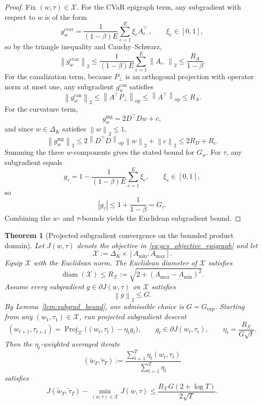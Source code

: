 \documentclass[11pt]{article}
\newcommand{\1}{\mathbf{1}}
\newcommand{\proj}{\operatorname{Proj}}
\newcommand{\norm}[1]{\left\lVert #1 \right\rVert}
\newcommand{\abs}[1]{\left\lvert #1 \right\rvert}
\newcommand{\Dset}{\Delta_K}
\newcommand{\Pperp}{P_\perp}
\theoremstyle{plain}
\newtheorem{theorem}{Theorem}[section]
\theoremstyle{definition}
\theoremstyle{remark}
\begin{document}
\begin{proof}
Fix $(w,\tau)\in\mathcal{X}$. For the CVaR epigraph term, any subgradient with respect to $w$ is of the form
\[
g^{\mathrm{cvar}}_w = \frac{1}{(1-\beta)E}\sum_{e=1}^E \xi_e A_{e\cdot}^\top,
\qquad \xi_e\in[0,1],
\]
so by the triangle inequality and Cauchy--Schwarz,
\[
\norm{g^{\mathrm{cvar}}_w}_2
\le \frac{1}{(1-\beta)E}\sum_{e=1}^E \norm{A_{e\cdot}}_2
\le \frac{R_A}{1-\beta}.
\]
For the canalization term, because $\Pperp$ is an orthogonal projection with operator norm at most one, any subgradient $g^{\mathrm{can}}_w$ satisfies
\[
\norm{g^{\mathrm{can}}_w}_2 \le \norm{A^\top\Pperp}_{\mathrm{op}} \le \norm{A^\top}_{\mathrm{op}} \le R_A.
\]
For the curvature term,
\[
g^{\mathrm{mg}}_w = 2D^\top Dw + c,
\]
and since $w\in\Dset$ satisfies $\norm{w}_2\le 1$,
\[
\norm{g^{\mathrm{mg}}_w}_2 \le 2\norm{D^\top D}_{\mathrm{op}}\norm{w}_2 + \norm{c}_2 \le 2R_D + R_c.
\]
Summing the three $w$-components gives the stated bound for $G_w$. For $\tau$, any subgradient equals
\[
g_\tau = 1 - \frac{1}{(1-\beta)E}\sum_{e=1}^E \xi_e,
\qquad \xi_e\in[0,1],
\]
so
\[
\abs{g_\tau}\le 1+\frac{1}{1-\beta}=G_\tau.
\]
Combining the $w$- and $\tau$-bounds yields the Euclidean subgradient bound.
\end{proof}

\begin{theorem}[Projected subgradient convergence on the bounded product domain]\label{thm:subgrad}
Let $J(w,\tau)$ denote the objective in \eqref{eq:gcs_objective_epigraph} and let
\[
\mathcal{X} := \Dset \times [A_{\min},A_{\max}].
\]
Equip $\mathcal{X}$ with the Euclidean norm. The Euclidean diameter of $\mathcal{X}$ satisfies
\[
\operatorname{diam}(\mathcal{X}) \le R_{\mathcal{X}} := \sqrt{2 + (A_{\max}-A_{\min})^2}.
\]
Assume every subgradient $g\in\partial J(w,\tau)$ on $\mathcal{X}$ satisfies
\[
\norm{g}_2 \le G.
\]
By Lemma~\ref{lem:subgrad_bound}, one admissible choice is $G=G_{\mathrm{exp}}$.
Starting from any $(w_1,\tau_1)\in\mathcal{X}$, run projected subgradient descent
\[
(w_{t+1},\tau_{t+1}) = \proj_{\mathcal{X}}\bigl((w_t,\tau_t)-\eta_t g_t\bigr), \qquad g_t\in\partial J(w_t,\tau_t), \qquad \eta_t = \frac{R_{\mathcal{X}}}{G\sqrt{t}}.
\]
Then the $\eta_t$-weighted averaged iterate
\[
(\tilde w_T,\tilde\tau_T) := \frac{\sum_{t=1}^T \eta_t (w_t,\tau_t)}{\sum_{t=1}^T \eta_t}
\]
satisfies
\[
J(\tilde w_T,\tilde\tau_T)-\min_{(w,\tau)\in\mathcal{X}}J(w,\tau)
\le \frac{R_{\mathcal{X}}G(2+\log T)}{2\sqrt{T}}.
\]
\end{theorem}
\end{document}

